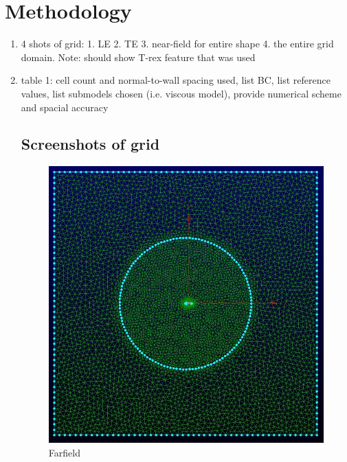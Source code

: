 \section{Methodology}

\begin{enumerate}
	\item 4 shots of grid: 1. LE 2. TE 3. near-field for entire shape 4. the entire grid domain. Note: should show T-rex feature that was used
	\item table 1: cell count and normal-to-wall spacing used, list BC, list reference values, list submodels chosen (i.e. viscous model), provide numerical scheme and spacial accuracy
	
\subsection{Screenshots of grid}

\begin{figure}[H]
	\centering
	\includegraphics[width=\textwidth]{general_images/farfield}
	\caption{Farfield}
\label{fig:farfield}
\end{figure}


\end{enumerate}
